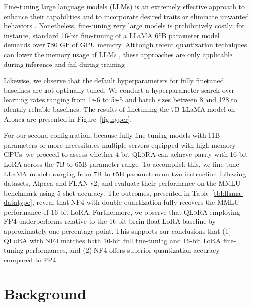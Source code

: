 Fine-tuning large language models (LLMs) is an extremely effective approach to enhance their capabilities \citep{min2021metaicl, wei2021finetuned, ouyang2022training, wang2022super, wang2022self, liu2022few} and to incorporate desired traits or eliminate unwanted behaviors \citep{ouyang2022training, askell2021general, bai2022training}. Nonetheless, fine-tuning very large models is prohibitively costly; for instance, standard 16-bit fine-tuning of a LLaMA 65B parameter model~\citep{touvron2023llama} demands over 780 GB of GPU memory. Although recent quantization techniques can lower the memory usage of LLMs \citep{dettmers2022llm, dettmers2022case, frantar2022gptq, xiao2022smoothquant}, these approaches are only applicable during inference and fail during training \citep{wortsman2023stable}.

Likewise, we observe that the default hyperparameters for fully finetuned baselines are not optimally tuned. We conduct a hyperparameter search over learning rates ranging from 1e-6 to 5e-5 and batch sizes between 8 and 128 to identify reliable baselines. The results of finetuning the 7B LLaMA model on Alpaca are presented in Figure~\ref{fig:hyper}.

For our second configuration, because fully fine-tuning models with 11B parameters or more necessitates multiple servers equipped with high-memory GPUs, we proceed to assess whether 4-bit \textsc{QLoRA} can achieve parity with 16-bit LoRA across the 7B to 65B parameter range. To accomplish this, we fine-tune LLaMA models ranging from 7B to 65B parameters on two instruction-following datasets, Alpaca and FLAN v2, and evaluate their performance on the MMLU benchmark using 5-shot accuracy. The outcomes, presented in Table~\ref{tbl:llama-datatype}, reveal that NF4 with double quantization fully recovers the MMLU performance of 16-bit LoRA. Furthermore, we observe that \textsc{QLoRA} employing FP4 underperforms relative to the 16-bit brain float LoRA baseline by approximately one percentage point. This supports our conclusions that (1) \textsc{QLoRA} with NF4 matches both 16-bit full fine-tuning and 16-bit LoRA fine-tuning performances, and (2) NF4 offers superior quantization accuracy compared to FP4.



\section{Background}
